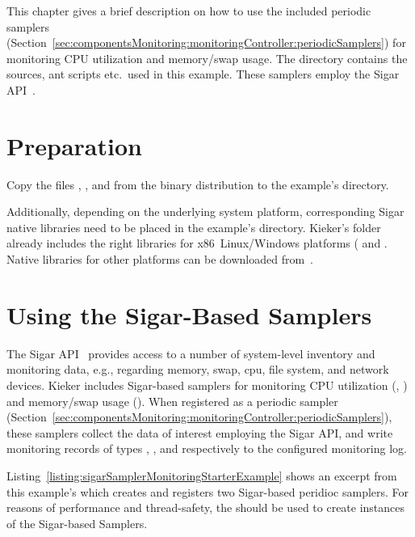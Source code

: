 This chapter gives a brief description on how to use the included %
periodic samplers (Section~\ref{sec:componentsMonitoring:monitoringController:periodicSamplers}) %
for monitoring CPU utilization and memory/swap usage. %
The directory \dir{\SigarExampleDirDistro/} contains the %
sources, ant scripts etc.\ used in this example. %
These samplers employ the Sigar API~\cite{HypericSigarWebsite}. \\%

\section{Preparation}

\begin{compactenum}
\item Copy the files \file{\mainJar}, \file{\commonsLoggingJar}, and \file{\sigarJar} from the %
binary distribution to the example's  directory.
\item Additionally, depending on the underlying system platform, %
corresponding Sigar native libraries need to be placed in the example's  directory. %
Kieker's  folder already includes the right libraries for x86~Linux/Windows platforms %
( and . %
Native libraries for other platforms can be downloaded from~\cite{HypericSigarWebsite}. %
\end{compactenum}

\section{Using the Sigar-Based Samplers}

The Sigar API~\cite{HypericSigarWebsite} provides access to a number of system-level inventory and monitoring data, %
e.g., regarding memory, swap, cpu, file system, and network devices. %
Kieker includes Sigar-based samplers %
for monitoring CPU utilization %
(, ) %
and memory/swap usage (). %
When registered as a periodic sampler (Section~\ref{sec:componentsMonitoring:monitoringController:periodicSamplers}), %
these samplers collect the data of interest employing the Sigar API, %
and write monitoring records of types , %
, and  respectively %
to the configured monitoring log. %

Listing~\ref{listing:sigarSamplerMonitoringStarterExample} shows an excerpt from %
this example's  %
which creates and registers two Sigar-based peridioc samplers. %
For reasons of performance and thread-safety, the  %
should be used to create instances of the Sigar-based Samplers. 

